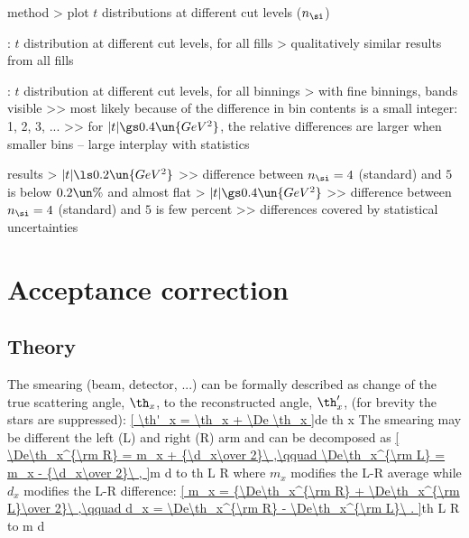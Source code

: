 \> method
\>> plot $t$ distributions at different cut levels ($n_\si$)

\> : $t$ distribution at different cut levels, for all fills
\>> qualitatively similar results from all fills

\> : $t$ distribution at different cut levels, for all binnings
\>> with fine binnings, bands visible
\>>> most likely because of the difference in bin contents is a small integer: 1, 2, 3, ...
\>>> for $|t| \gs 0.4\un{GeV^2}$, the relative differences are larger when smaller bins -- large interplay with statistics

\> results
\>> $|t| \ls 0.2\un{GeV^2}$
\>>> difference between $n_\si = 4$ (standard) and $5$ is below $0.2\un{\%}$ and almost flat
\>> $|t| \gs 0.4\un{GeV^2}$
\>>> difference between $n_\si = 4$ (standard) and $5$ is few percent
\>>> differences covered by statistical uncertainties



\chapter{Acceptance correction}

\section{Theory}

\vskip3mm

The smearing (beam, detector, ...) can be formally described as change of the true scattering angle, $\th_x$, to the reconstructed angle, $\th'_x$, (for brevity the stars are suppressed):
\eqref{
\th'_x = \th_x + \De \th_x
}{de th x}
The smearing may be different the left (L) and right (R) arm and can be decomposed as
\eqref{
\De\th_x^{\rm R} = m_x + {\d_x\over 2}\ ,\qquad \De\th_x^{\rm L} = m_x - {\d_x\over 2}\ ,
}{m d to th L R}
where $m_x$ modifies the L-R average while $d_x$ modifies the L-R difference:
\eqref{
m_x = {\De\th_x^{\rm R} + \De\th_x^{\rm L}\over 2}\ ,\qquad d_x = \De\th_x^{\rm R} - \De\th_x^{\rm L}\ .
}{th L R to m d}

